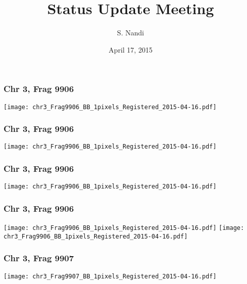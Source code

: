 \documentclass[10pt,dvipsnames,table]{beamer}
\title[Status Update Apr '15]{Status Update Meeting}
\author{S. Nandi}
\institute[LMCG]{LMCG \\
 University of Wisconsin-Madison}
\date{April 17, 2015}
\begin{document}
\setlength{\baselineskip}{16truept}
\frame{\maketitle}



\begin{frame}
\frametitle{Chr 3, Frag 9906}
\begin{center}
\texttt{[image: chr3\_Frag9906\_BB\_1pixels\_Registered\_2015-04-16.pdf]}
\end{center}
\end{frame}

\begin{frame}
\frametitle{Chr 3, Frag 9906}
\begin{center}
\texttt{[image: chr3\_Frag9906\_BB\_1pixels\_Registered\_2015-04-16.pdf]}
\end{center}
\end{frame}

\begin{frame}
\frametitle{Chr 3, Frag 9906}
\begin{center}
\texttt{[image: chr3\_Frag9906\_BB\_1pixels\_Registered\_2015-04-16.pdf]}
\end{center}
\end{frame}

\begin{frame}
\frametitle{Chr 3, Frag 9906}
\begin{center}
\texttt{[image: chr3\_Frag9906\_BB\_1pixels\_Registered\_2015-04-16.pdf]}
\texttt{[image: chr3\_Frag9906\_BB\_1pixels\_Registered\_2015-04-16.pdf]}
\end{center}
\end{frame}

\begin{frame}
\frametitle{Chr 3, Frag 9907}
\begin{center}
\texttt{[image: chr3\_Frag9907\_BB\_1pixels\_Registered\_2015-04-16.pdf]}
\end{center}
\end{frame}
\end{document}
